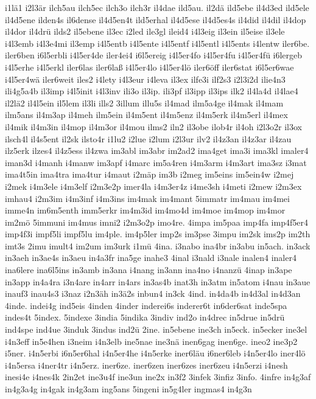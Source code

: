 {i1lä1
i2l3är
ilch5au
ilch5ec
ilch3o
ilch3r
il4dae
ild5au.
il2dä
ild5ebe
il4d3ed
ild5ele
il4d5ene
ilden4s
il6dense
il4d5en4t
ild5erhal
il4d5ese
il4d5es4s
il4did
il4dil
il4dop
il4dor
il4drü
ilds2
il5ebene
il3ec
i2led
ile3gl
ileid4
i4l3eig
il3ein
il5eise
il3ele
i4l3emb
i4l3e4mi
il3emp
i4l5entb
i4l5ente
i4l5entf
i4l5entl
i4l5ents
i4lentw
iler6be.
iler6ben
i6l5erbli
i4l5er4de
iler4ei4
i6l5ereig
i4l5er4fo
i4l5er4fu
i4l5er4fü
i6lergeb
i4l5erhe
i4l5erkl
iler6las
iler6laß
i4l5er4lo
i4l5er4lö
iler6öff
iler6stat
i6l5er6wae
i4l5er4wä
iler6weit
iles2
i4lety
i4l3eur
i4leva
il3ex
ilfe3i
ilf2s3
i2l3i2d
ilie4n3
ili4g5a4b
il3imp
i4l5init
i4l3inv
ili3o
il3ip.
ili3pf
il3ipp
il3ips
ilk2
il4la4d
il4lae4
il2lä2
il4l5ein
il5lem
il3li
ills2
3illum
illu5s
il4mad
ilm5a4ge
il4mak
il4mam
ilm5ans
il4m3ap
il4meh
ilm5ein
il4m5ent
il4m5enz
il4m5erk
il4m5erl
il4mex
il4mik
il4m3in
il4mop
il4m3or
il4mou
ilms2
iln2
il3obe
ilob4r
il4oh
i2l3o2r
il3ox
ilsch4l
il4s5ent
il2sk
ilsto4r
i1lu2
i2lue
i2lum
i2l3ur
ilv2
il4z3an
il4z3ar
il4zau
ilz5erk
ilzes4
il4z5ess
il4zwa
im3abl
im3abr
im2ad2
ima4get
ima3i
ima3kl
imaler4
iman3d
i4manh
i4manw
im3apf
i4marc
im5a4ren
i4m3arm
i4m3art
ima3sz
i3mat
ima4t5in
ima4tra
ima4tur
i4maut
i2mäp
im3b
i2meg
im5eins
im5ein4w
i2mej
i2mek
i4m3ele
i4m3elf
i2m3e2p
imer4la
i4m3er4z
i4me3sh
i4meti
i2mew
i2m3ex
imhau4
i2m3im
i4m3inf
i4m3ins
im4mak
im4mant
5immatr
im4mau
im4mei
imme4n
im6m5enth
imm5erkr
im4m3id
im4mo4d
im4moe
im4mop
im4mor
im2mö
5immuni
im4mus
imni2
i2m3o2p
imo4re.
4impa
im5paa
imp4fa
imp4f5er4
imp4f3i
impf5li
impf5lu
im4ple.
im4p5ler
imp2s
im3pse
3impu
im2sk
ims2p
im2th
imt3s
2imu
imult4
im2um
im3urk
i1mü
4ina.
i3nabo
ina4br
in3abu
in5ach.
in3ack
in3aeh
in3ae4s
in3aeu
in4a3fr
ina5ge
inahe3
4inal
i3nald
i3nale
inalen4
inaler4
ina6lere
ina6l5ins
in3amb
in3ana
i4nang
in3ann
ina4no
i4nanzü
4inap
in3ape
in3app
in4a4ra
i3n4are
in4arr
in4ars
in3as4b
inat3h
in3atm
in5atom
i4nau
in3aue
inauf3
inau4s3
i3naz
i2n3äh
in3ä2s
inbun4
in3ck
4ind.
in4da4b
in4d3al
in4d3an
4inde.
indei4g
ind5eis
4inden
4inder
inderei6s
inderer6t
in6der6sat
inde5spa
indes4t
5index.
5indexe
3india
5indika
3indiv
ind2o
in4drec
in5drue
in5drü
ind4spe
ind4ue
3induk
3indus
ind2ü
2ine.
in5ebene
ine3ch
in5eck.
in5ecker
ine3el
i4n3eff
in5e4hen
i3neim
i4n3elb
ine5nae
ine3nä
inen6gag
inen6ge.
ineo2
ine3p2
i5ner.
i4n5erbi
i6n5er6hal
i4n5er4he
i4n5erke
iner6läu
i6ner6leb
i4n5er4lo
iner4lö
i4n5ersa
i4ner4tr
i4n5erz.
iner6ze.
iner6zen
iner6zes
iner6zeu
i4n5erzi
i4nesh
inesi4e
i4nes4k
2in2et
ine3u4f
ine3un
ine2x
in3f2
3infek
3infiz
3info.
4infre
in4g3af
in4g3a4g
in4gak
in4g3am
ing5ans
5ingeni
in5g4ler
ingmas4
in4g3n
}
